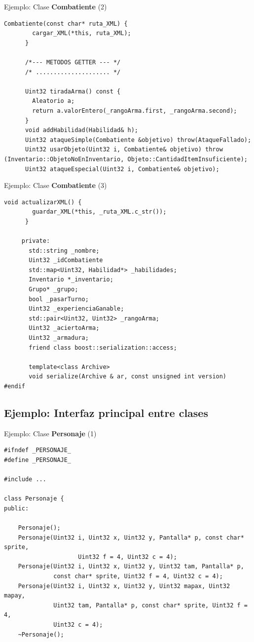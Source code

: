 \documentclass[9pt,xcolor=svgnames]{beamer}
\begin{document}
  \begin{frame}[fragile=singleslide]{Ejemplo: Clase \textbf{Combatiente} (2)}
   \begin{lstlisting}[style=C++]                  
      Combatiente(const char* ruta_XML) {
        cargar_XML(*this, ruta_XML);
      }

      /*--- METODOS GETTER --- */
      /* ..................... */

      Uint32 tiradaArma() const {
        Aleatorio a;
        return a.valorEntero(_rangoArma.first, _rangoArma.second);
      }
      void addHabilidad(Habilidad& h);
      Uint32 ataqueSimple(Combatiente &objetivo) throw(AtaqueFallado);
      Uint32 usarObjeto(Uint32 i, Combatiente& objetivo) throw (Inventario::ObjetoNoEnInventario, Objeto::CantidadItemInsuficiente);
      Uint32 ataqueEspecial(Uint32 i, Combatiente& objetivo);   
   \end{lstlisting}
   
  \end{frame}
  \begin{frame}[fragile=singleslide]{Ejemplo: Clase \textbf{Combatiente} (3)}
   \begin{lstlisting}[style=C++]
      void actualizarXML() {
        guardar_XML(*this, _ruta_XML.c_str());
      }

     private:
       std::string _nombre;
       Uint32 _idCombatiente
       std::map<Uint32, Habilidad*> _habilidades;
       Inventario *_inventario;
       Grupo* _grupo;
       bool _pasarTurno;
       Uint32 _experienciaGanable;
       std::pair<Uint32, Uint32> _rangoArma;
       Uint32 _aciertoArma;
       Uint32 _armadura;
       friend class boost::serialization::access;

       template<class Archive>
       void serialize(Archive & ar, const unsigned int version)
#endif
   \end{lstlisting}
 \end{frame}
  
  \subsection{Ejemplo: Interfaz principal entre clases}
  \begin{frame}[fragile=singleslide]{Ejemplo: Clase \textbf{Personaje} (1)}
   
   \begin{lstlisting}[style=C++]
#ifndef _PERSONAJE_
#define _PERSONAJE_

#include ...

class Personaje {
public:

    Personaje();
    Personaje(Uint32 i, Uint32 x, Uint32 y, Pantalla* p, const char* sprite,
                     Uint32 f = 4, Uint32 c = 4);               
    Personaje(Uint32 i, Uint32 x, Uint32 y, Uint32 tam, Pantalla* p,
              const char* sprite, Uint32 f = 4, Uint32 c = 4);       
    Personaje(Uint32 i, Uint32 x, Uint32 y, Uint32 mapax, Uint32 mapay,
              Uint32 tam, Pantalla* p, const char* sprite, Uint32 f = 4,
              Uint32 c = 4);
    ~Personaje();


   \end{lstlisting}
  \end{frame}
  
\end{document}

